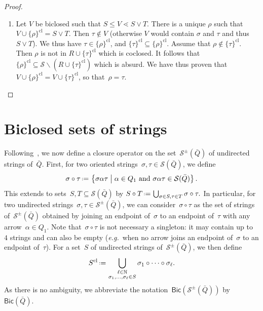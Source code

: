 \documentclass{amsart}
\theoremstyle{definition}
\newcommand{\N}{\mathbb{N}} %
\newcommand{\cS}{\mathcal{S}} %
\newcommand{\set}[2]{\left\{ #1 \;\middle|\; #2 \right\}} %
\newcommand{\ssm}{\smallsetminus} %
\newcommand{\eqdef}{\mbox{\,\raisebox{0.2ex}{\scriptsize\ensuremath{\mathrm:}}\ensuremath{=}\,}} %
\newcommand{\eg}{\textit{e.g.}~} %
\newcommand{\strings}{\mathcal{S}} %
\newcommand{\closure}[1]{#1^{\mathrm{cl}}} %
\newcommand{\Bicl}[1]{\mathsf{Bic}(#1)} %
\begin{document}
\begin{proof}
\begin{enumerate}
\item Let $V$ be biclosed such that ${S \leq V \lessdot S \vee T}$.
There is a unique $\rho$ such that ${V \cup \closure{\{\rho\}} = S \vee T}$.
Then $\tau\notin V$ (otherwise $V$ would contain $\sigma$ and $\tau$ and thus $S\vee T$).
We thus have $\tau\in\closure{\{\rho\}}$, and $\closure{\{\tau\}}\subseteq\closure{\{\rho\}}$.
Assume that $\rho\notin\closure{\{\tau\}}$.
Then $\rho$ is not in $R\cup\closure{\{\tau\}}$ which is coclosed.
It follows that~$\closure{\{\rho\}}\subseteq \cS\ssm \left(R\cup\closure{\{\tau\}}\right)$ which is absurd.
We have thus proven that~$V \cup \closure{\{\rho\}} = V \cup \closure{\{\tau\}}$, so that~$\rho=\tau$.
\qedhere
\end{enumerate}
\end{proof}

\section{Biclosed sets of strings}
\label{sec:biclosedStrings}

Following~\cite[Sect.~6]{McConville}, we now define a closure operator on the set~$\strings^\pm(\bar Q)$ of undirected strings of~$\bar Q$.
First, for two oriented strings~$\sigma, \tau \in \strings(\bar Q)$, we define
\[
\sigma \circ \tau \eqdef \set{\sigma \alpha \tau}{\alpha \in Q_1 \text{ and } \sigma \alpha \tau \in \strings(\bar Q)}.
\]
This extends to sets~$S,T \subseteq \strings(\bar Q)$ by
\(
S \circ T \eqdef \bigcup_{\sigma \in S, \tau \in T} \sigma \circ \tau.
\)
In particular, for two undirected strings~$\sigma, \tau \in \strings^\pm(\bar Q)$, we can consider~$\sigma \circ \tau$ as the set of strings of~$\strings^\pm(\bar Q)$ obtained by joining an endpoint of~$\sigma$ to an endpoint of~$\tau$ with any arrow~$\alpha \in Q_1$.
Note that~$\sigma \circ \tau$ is not necessary a singleton: it may contain up to~$4$ strings and can also be empty (\eg when no arrow joins an endpoint of~$\sigma$ to an endpoint of~$\tau$).
For a set~$S$ of undirected strings of~$\strings^\pm(\bar Q)$, we then define
\[
\closure{S} \eqdef \bigcup_{\substack{\ell \in \N \\ \sigma_1, \dots, \sigma_\ell \in S}} \sigma_1 \circ \dots \circ \sigma_\ell.
\]
As there is no ambiguity, we abbreviate the notation~$\Bicl{\strings^\pm(\bar Q)}$ by~$\Bicl{\bar Q}$.
\end{document}
